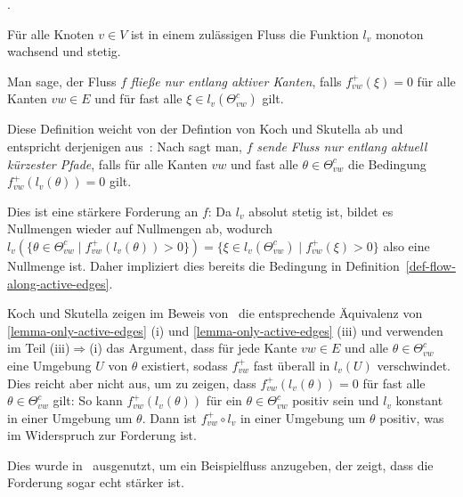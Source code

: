 .

\begin{lemma}
	Für alle Knoten $v\in V$ ist in einem zulässigen Fluss die Funktion $l_v$ monoton wachsend und stetig.
\end{lemma}

\begin{definition}\label{def-flow-along-active-edges}
	Man sage, der Fluss $f$ \emph{fließe nur entlang aktiver Kanten}, falls $f_{vw}^+(\xi)=0$ für alle Kanten $vw\in E$ und für fast alle $\xi\in l_v(\Theta_{vw}^c)$ gilt.
\end{definition}



\begin{remark}
	Diese Definition weicht von der Defintion von Koch und Skutella ab und entspricht derjenigen aus~\cite[Definition 1]{Cominetti2015}:
	Nach \cite[Definition 2]{Koch2011} sagt man, $f$ \emph{sende Fluss nur entlang aktuell kürzester Pfade}, falls für alle Kanten $vw$ und fast alle $\theta\in\Theta^c_{vw}$ die Bedingung $f_{vw}^+(l_v(\theta))=0$ gilt.
	
	Dies ist eine stärkere Forderung an $f$:
	Da $l_v$ absolut stetig ist, bildet es Nullmengen wieder auf Nullmengen ab, wodurch $l_v(\{ \theta \in \Theta_{vw}^c \mid f_{vw}^+ (l_v(\theta)) > 0 \}) = \{ \xi \in l_v(\Theta_{vw}^c) \mid f_{vw}^+ (\xi) > 0 \}$ also eine Nullmenge ist.
	Daher impliziert dies bereits die Bedingung in Definition~\ref{def-flow-along-active-edges}.
	
	Koch und Skutella zeigen im Beweis von~\cite[Lemma 1]{Koch2011} die entsprechende Äquivalenz von \ref{lemma-only-active-edges} (i) und \ref{lemma-only-active-edges} (iii) und
	verwenden im Teil (iii)$\Rightarrow$(i) das Argument, dass für jede Kante $vw\in E$ und alle $\theta\in \Theta_{vw}^c$ eine Umgebung $U$ von $\theta$ existiert, sodass $f_{vw}^+$ fast überall in $l_v(U)$ verschwindet.
	Dies reicht aber nicht aus, um zu zeigen, dass $f_{vw}^+(l_v(\theta))=0$ für fast alle $\theta\in\Theta_{vw}^c$ gilt:
	So kann $f_{vw}^+(l_v(\theta))$ für ein $\theta\in\Theta_{vw}^c$ positiv sein und $l_v$ konstant in einer Umgebung um $\theta$.
	Dann ist $f_{vw}^+ \circ l_v$ in einer Umgebung um $\theta$ positiv, was im Widerspruch zur Forderung ist.
	
	Dies wurde in~\cite[Example 2]{Cominetti2015} ausgenutzt, um ein Beispielfluss anzugeben, der zeigt, dass die Forderung sogar echt stärker ist.
\end{remark}

